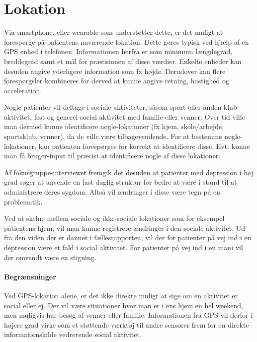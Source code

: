 \section{Lokation}
Via smartphone, eller wearable som understøtter dette, er det muligt at forespørge på patientens nuværende lokation.
Dette gøres typisk ved hjælp af en GPS enhed i telefonen.
Informationen herfra er som minimum længdegrad, breddegrad samt et mål for præcisionen af disse værdier.
Enkelte enheder kan desuden angive yderligere information som fx højde.
Derudover kan flere forespørgsler kombineres for derved at kunne angive retning, hastighed og acceleration.

Nogle patienter vil deltage i sociale aktiviteter, såsom sport eller anden klub-aktivitet, fest og generel social aktivitet med familie eller venner.
Over tid ville man dermed kunne identificere nøgle-lokationer (fx hjem, skole/arbejde, sportsklub, venner), da de ville være tilbagevendende.
For at bestemme nøgle-lokationer, kan patienten forespørges for korrekt at identificere disse.
Evt. kunne man få bruger-input til præcist at identificere nogle af disse lokationer.

Af fokusgruppe-interviewet fremgik det desuden at patienter med depression i høj grad søger at anvende en fast daglig struktur for bedre at være i stand til at administrere deres sygdom.
Altså vil ændringer i disse være tegn på en problematik.

Ved at skelne mellem sociale og ikke-sociale lokationer som for eksempel patientens hjem, vil man kunne registrere ændringer i den sociale aktivitet.
Ud fra den viden der er dannet i fællesrapporten, vil der for patienter på vej ind i en depression være et fald i social aktivitet.
For patienter på vej ind i en mani vil der omvendt være en stigning.

\paragraph{Begrænsninger}
Ved GPS-lokation alene, er det ikke direkte muligt at sige om en aktivitet er social eller ej.
Der vil være situationer hvor man er i ens hjem en hel weekend, men muligvis har besøg af venner eller familie.
Informationen fra GPS vil derfor i højere grad virke som et støttende værktøj til andre sensorer frem for en direkte informationskilde vedrørende social aktivitet.